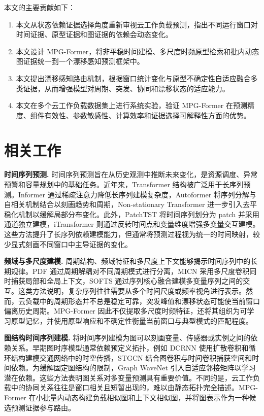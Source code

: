 \documentclass[UTF8]{ctexart}
\begin{document}
本文的主要贡献如下：
\begin{enumerate}
    \item 本文从状态依赖证据选择角度重新审视云工作负载预测，指出不同运行窗口对时间证据、原型证据和图证据的依赖会动态变化。
    \item 本文设计 MPG-Former，将非平稳时间建模、多尺度时频原型检索和批内动态图证据统一到一个漂移感知预测框架中。
    \item 本文提出漂移感知路由机制，根据窗口统计变化与原型不确定性自适应融合多类证据，从而增强模型对周期、突发、协同和漂移状态的适应能力。
    \item 本文在多个云工作负载数据集上进行系统实验，验证 MPG-Former 在预测精度、组件有效性、参数敏感性、计算效率和证据选择可解释性方面的优势。
\end{enumerate}

\section{相关工作}

\noindent\textbf{时间序列预测.}
时间序列预测旨在从历史观测中推断未来变化，是资源调度、异常预警和容量规划中的基础任务。近年来，Transformer 结构被广泛用于长序列预测。Informer 通过稀疏注意力降低长序列建模复杂度\cite{zhou2021informer}，Autoformer 将序列分解与自相关机制结合以刻画趋势和周期\cite{wu2021autoformer}，Non-stationary Transformer 进一步引入去平稳化机制以缓解局部分布变化\cite{liu2022nonstationary}。此外，PatchTST 将时间序列划分为 patch 并采用通道独立建模\cite{nie2023patchtst}，iTransformer 则通过反转时间点和变量维度增强多变量交互建模\cite{liu2024itransformer}。这些方法提升了长序列依赖建模能力，但通常将预测过程视为统一的时间映射，较少显式刻画不同窗口中主导证据的变化。

\noindent\textbf{频域与多尺度建模.}
周期结构、频域特征和多尺度上下文能够揭示时间序列中的长期规律。PDF 通过周期解耦对不同周期模式进行分离\cite{dai2024pdf}，MICN 采用多尺度卷积同时捕获局部和全局上下文\cite{wang2023micn}，SOFTS 通过序列核心融合建模多变量序列之间的交互\cite{han2024softs}。这类方法说明，复杂序列往往需要从多个时间尺度或频率视角进行表示。然而，云负载中的周期形态并不总是稳定可靠，突发峰值和漂移状态可能使当前窗口偏离历史周期。MPG-Former 因此不仅提取多尺度时频特征，还将其组织为可学习原型记忆，并使用原型响应和不确定性衡量当前窗口与典型模式的匹配程度。

\noindent\textbf{图结构时间序列建模.}
将时间序列建模为图可以刻画变量、传感器或实例之间的依赖关系。早期图时序模型通常依赖预定义拓扑，例如 DCRNN 使用扩散卷积和循环结构建模交通网络中的时空传播\cite{li2018dcrnn}，STGCN 结合图卷积与时间卷积捕获空间和时间依赖\cite{yu2018stgcn}。为缓解固定图结构的限制，Graph WaveNet 引入自适应邻接矩阵以学习潜在依赖\cite{wu2019graphwavenet}。这些方法表明图关系对多变量预测具有重要价值。不同的是，云工作负载中的协同关系往往是窗口相关且短暂出现的，难以由静态拓扑完全描述。MPG-Former 在小批量内动态构建负载相似图和上下文相似图，并将图表示作为一种候选预测证据参与路由。
\end{document}
